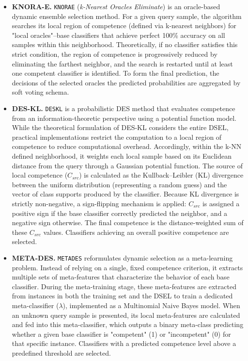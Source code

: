 \documentclass[conference]{IEEEtran}
\begin{document}
\begin{itemize} 
\item \textbf{KNORA-E.} \texttt{KNORAE} (\textit{k-Nearest Oracles Eliminate}) is an oracle-based dynamic ensemble selection method. For a given query sample, the algorithm searches its local region of competence (defined via k-nearest neighbors) for "local oracles"--base classifiers that achieve perfect 100\% accuracy on all samples within this neighborhood. Theoretically, if no classifier satisfies this strict condition, the region of competence is progressively reduced by eliminating the farthest neighbor, and the search is restarted until at least one competent classifier is identified. To form the final prediction, the decisions of the selected oracles the predicted probabilities are aggregated by soft voting schema.

\item \textbf{DES-KL.} \texttt{DESKL} is a probabilistic DES method that evaluates competence from an information-theoretic perspective using a potential function model. While the theoretical formulation of DES-KL considers the entire DSEL, practical implementations restrict the computation to a local region of competence to reduce computational overhead. Accordingly, within the k-NN defined neighborhood, it weights each local sample based on its Euclidean distance from the query through a Gaussian potential function. The source of local competence ($C_{src}$) is calculated as the Kullback--Leibler (KL) divergence between the uniform distribution (representing a random guess) and the vector of class supports produced by the classifier. Because KL divergence is strictly non-negative, a sign-flipping mechanism is applied: $C_{src}$ is assigned a positive sign if the base classifier correctly predicted the neighbor, and a negative sign otherwise. The final competence is the distance-weighted sum of these $C_{src}$ values. Classifiers achieving an overall positive competence are selected.

\item \textbf{META-DES.} \texttt{METADES} reformulates dynamic selection as a meta-learning problem. Instead of relying on a single, fixed competence criterion, it extracts multiple sets of meta-features that characterize the behavior of each base classifier. During the meta-training stage, these meta-features are extracted from instances in both the training set and the DSEL to train a dedicated meta-classifier ($\lambda$), implemented as a Multinomial Naive Bayes model. When an unknown query sample is presented, its local meta-features are calculated and fed into this meta-classifier, which outputs a binary meta-class predicting whether a given base classifier is "competent" (1) or "incompetent" (0) for that specific instance. Classifiers with a predicted competence level above a predefined threshold are selected.
\end{itemize}
\end{document}
